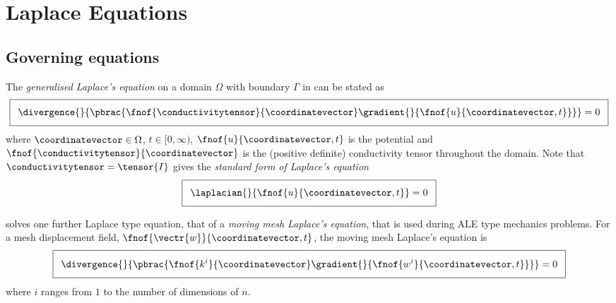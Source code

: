 \section{Laplace Equations}
\label{sec:LaplaceEquations}

\subsection{Governing equations}

The \emph{generalised Laplace's equation} on a domain $\Omega$ with boundary $\Gamma$
in \OpenCMISS can be stated as
\begin{equation}
  \addtolength{\fboxsep}{5pt}
  \boxed{
    \divergence{}{\pbrac{\fnof{\conductivitytensor}{\coordinatevector}\gradient{}{\fnof{u}{\coordinatevector,t}}}}=0
  }
  \label{eqn:GeneralisedLaplaceEquation}
\end{equation}
where $\coordinatevector\in\Omega$, $t\in[0,\infty)$, $\fnof{u}{\coordinatevector,t}$ is the potential and 
$\fnof{\conductivitytensor}{\coordinatevector}$ is the (positive definite) conductivity
tensor throughout the domain. Note that $\conductivitytensor=\tensor{I}$ gives 
the \emph{standard form of Laplace's equation} \ie
\begin{equation}
  \addtolength{\fboxsep}{5pt}
  \boxed{
    \laplacian{}{\fnof{u}{\coordinatevector,t}}=0
  }
  \label{eqn:LaplaceEquation}
\end{equation}

\OpenCMISS solves one further Laplace type equation, that of a \emph{moving mesh Laplace's equation}, that is used during ALE type mechanics problems. For a mesh displacement field, $\fnof{\vectr{w}}{\coordinatevector,t}$, the moving mesh Laplace's equation is
\begin{equation}
  \addtolength{\fboxsep}{5pt}
  \boxed{
    \divergence{}{\pbrac{\fnof{k^{i}}{\coordinatevector}\gradient{}{\fnof{w^{i}}{\coordinatevector,t}}}}=0
  }
  \label{eqn:MovingMeshLaplaceEquation}
\end{equation}
where $i$ ranges from $1$ to the number of dimensions of $n$.

